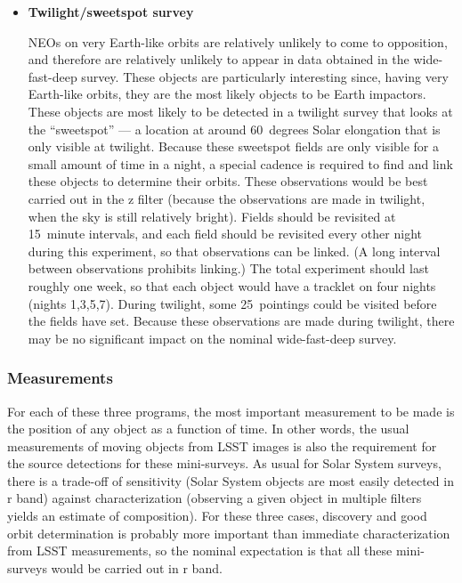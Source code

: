 \begin{itemize}
\item{{\bf Twilight/sweetspot survey}}

NEOs on very Earth-like orbits are relatively
unlikely to come to opposition, and therefore
are relatively unlikely to appear in data
obtained in the wide-fast-deep survey.
These objects are particularly interesting
since, having very Earth-like orbits, they
are the most likely objects to be Earth
impactors.
These objects are most likely to be detected
in a twilight survey that looks at the ``sweetspot'' --- 
a location at around 60~degrees Solar
elongation that is only visible at twilight.
Because these sweetspot fields are only visible
for a small amount of time in a night, a special
cadence is required to find and link these objects
to determine their orbits.
These observations would be best carried out
in the z filter (because the observations are
made in twilight, when the sky is still relatively
bright). Fields should be revisited at 15~minute 
intervals, and each field should be revisited
every other night during this experiment, so that
observations can be linked. 
(A long interval
between observations prohibits linking.)
The total experiment
should last roughly one week, so that each
object would have a tracklet on four nights
(nights 1,3,5,7).
During twilight, some 25~pointings could be visited
before the fields have set.
Because these observations are made during twilight,
there may be no significant impact on the 
nominal wide-fast-deep survey.
\end{itemize}

\subsubsection{Measurements}

For each of these three programs, the most important measurement
to be made is the position of any object as a function of time.
In other words, the usual measurements of moving
objects from LSST images is also the requirement for
the source detections for these mini-surveys. As usual
for Solar System surveys, there is a trade-off of
sensitivity (Solar System objects are most easily
detected in r band) against characterization (observing
a given object in multiple filters yields an estimate
of composition). For these three cases, discovery and
good orbit determination is probably more important than
immediate characterization from LSST measurements,
so the nominal expectation is that all these mini-surveys
would be carried out in r band.


